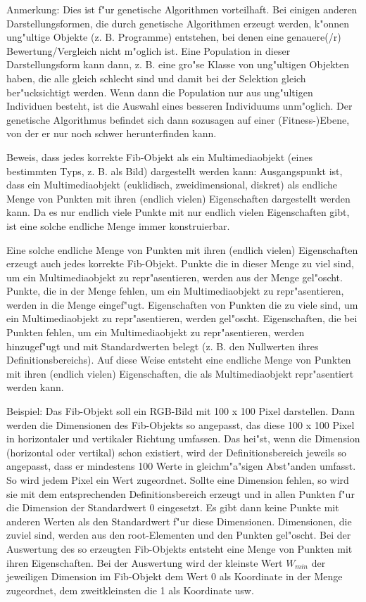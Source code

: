 Anmerkung: Dies ist f"ur genetische Algorithmen vorteilhaft. Bei einigen anderen Darstellungsformen, die durch genetische Algorithmen erzeugt werden, k"onnen ung"ultige Objekte (z. B. Programme) entstehen, bei denen eine genauere(/r) Bewertung/Vergleich nicht m"oglich ist. Eine Population in dieser Darstellungsform kann dann, z. B. eine gro"se Klasse von ung"ultigen Objekten haben, die alle gleich schlecht sind und damit bei der Selektion gleich ber"ucksichtigt werden. Wenn dann die Population nur aus ung"ultigen Individuen besteht, ist die Auswahl eines besseren Individuums unm"oglich. Der genetische Algorithmus befindet sich dann sozusagen auf einer (Fitness-)Ebene, von der er nur noch schwer herunterfinden kann.

\bigskip\noindent
Beweis, dass jedes korrekte Fib-Objekt als ein Multimediaobjekt (eines bestimmten Typs, z. B. als Bild) dargestellt werden kann: 
Ausgangspunkt ist, dass ein Multimediaobjekt (euklidisch, zweidimensional, diskret) als endliche Menge von Punkten mit ihren (endlich vielen) Eigenschaften dargestellt werden kann. Da es nur endlich viele Punkte mit nur endlich vielen Eigenschaften gibt, ist eine solche endliche Menge immer konstruierbar.

Eine solche endliche Menge von Punkten mit ihren (endlich vielen) Eigenschaften erzeugt auch jedes korrekte Fib-Objekt. Punkte die in dieser Menge zu viel sind, um ein Multimediaobjekt zu repr"asentieren, werden aus der Menge gel"oscht. Punkte, die in der Menge fehlen, um ein Multimediaobjekt zu repr"asentieren, werden in die Menge eingef"ugt. Eigenschaften von Punkten die zu viele sind, um ein Multimediaobjekt zu repr"asentieren, werden gel"oscht. Eigenschaften, die bei Punkten fehlen, um ein Multimediaobjekt zu repr"asentieren, werden hinzugef"ugt und mit Standardwerten belegt (z. B. den Nullwerten ihres Definitionsbereichs). Auf diese Weise entsteht eine endliche Menge von Punkten mit ihren (endlich vielen) Eigenschaften, die als Multimediaobjekt repr"asentiert werden kann.

\bigskip\noindent
Beispiel: Das Fib-Objekt soll ein RGB-Bild mit 100 x 100 Pixel darstellen. Dann werden die Dimensionen des Fib-Objekts so angepasst, das diese 100 x 100 Pixel in horizontaler und vertikaler Richtung umfassen. Das hei"st, wenn die Dimension (horizontal oder vertikal) schon existiert, wird der Definitionsbereich jeweils so angepasst, dass er mindestens 100 Werte in gleichm"a"sigen Abst"anden umfasst. So wird jedem Pixel ein Wert zugeordnet. Sollte eine Dimension fehlen, so wird sie mit dem entsprechenden Definitionsbereich erzeugt und in allen Punkten f"ur die Dimension der Standardwert 0 eingesetzt. Es gibt dann keine Punkte mit anderen Werten als den Standardwert f"ur diese Dimensionen. Dimensionen, die zuviel sind, werden aus den root-Elementen und den Punkten gel"oscht. Bei der Auswertung des so erzeugten Fib-Objekts entsteht eine Menge von Punkten mit ihren Eigenschaften. Bei der Auswertung wird der kleinste Wert $W_{min}$ der jeweiligen Dimension im Fib-Objekt dem Wert 0 als Koordinate in der Menge zugeordnet, dem zweitkleinsten die 1 als Koordinate usw. 

